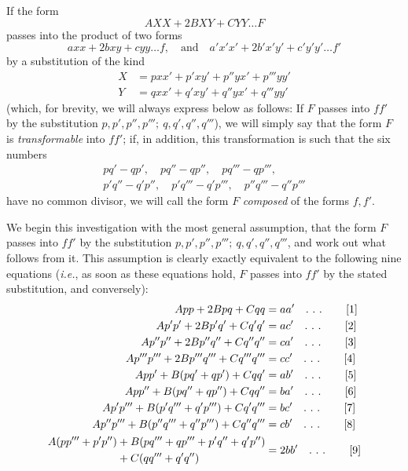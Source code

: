If the form
\[
AXX+2BXY+CYY\ldots F
\]
passes into the product of two forms
\[
axx+2bxy+cyy\ldots f,\quad\text{and}\quad a'x'x'+2b'x'y'+c'y'y'\ldots f'
\]
by a substitution of the kind
\[
\begin{aligned}
X&=pxx'+p'xy'+p''yx'+p'''yy'\\
Y&=qxx'+q'xy'+q''yx'+q'''yy'
\end{aligned}
\]
(which, for brevity, we will always express below as follows: If $F$ passes into $ff'$ by the substitution $p,p',p'',p''';\ q,q',q'',q'''$), we will simply say that the form $F$ is \textit{transformable} into $ff'$; if, in addition, this transformation is such that the six numbers
\[
\begin{gathered}pq'-qp',\quad pq''-qp'',\quad pq'''-qp''',\\p'q''-q'p'',\quad p'q'''-q'p''',\quad p''q'''-q''p'''\end{gathered}
\]
have no common divisor, we will call the form $F$ \textit{composed} of the forms $f,f'$.

We begin this investigation with the most general assumption, that the form $F$ passes into $ff'$ by the substitution $p,p',p'',p''';\ q,q',q'',q'''$, and work out what follows from it. This assumption is clearly exactly equivalent to the following nine equations (\textit{i.e.}, as soon as these equations hold, $F$ passes into $ff'$ by the stated substitution, and conversely):
\begin{align*}
App+2Bpq+Cqq&=aa'\quad\ldotp\,\ldotp\,\ldotp\tag*{[1]}\\
Ap'p'+2Bp'q'+Cq'q'&=ac'\quad\ldotp\,\ldotp\,\ldotp\tag*{[2]}\\
Ap''p''+2Bp''q''+Cq''q''&=ca'\quad\ldotp\,\ldotp\,\ldotp\tag*{[3]}\\
Ap'''p'''+2Bp'''q'''+Cq'''q'''&=cc'\quad\ldotp\,\ldotp\,\ldotp\tag*{[4]}\\
App'+B(pq'+qp')+Cqq'&=ab'\quad\ldotp\,\ldotp\,\ldotp\tag*{[5]}\\
App''+B(pq''+qp'')+Cqq''&=ba'\quad\ldotp\,\ldotp\,\ldotp\tag*{[6]}\\
Ap'p'''+B(p'q'''+q'p''')+Cq'q'''&=bc'\quad\ldotp\,\ldotp\,\ldotp\tag*{[7]}\\
Ap''p'''+B(p''q'''+q''p''')+Cq''q'''&=cb'\quad\ldotp\,\ldotp\,\ldotp\tag*{[8]}\\
\begin{aligned}A(pp'''+p'p'')&+B(pq'''+qp'''+p'q''+q'p'')\\&+C(qq'''+q'q'')\end{aligned}&=2bb'\quad\ldotp\,\ldotp\,\ldotp\tag*{[9]}
\end{align*}


